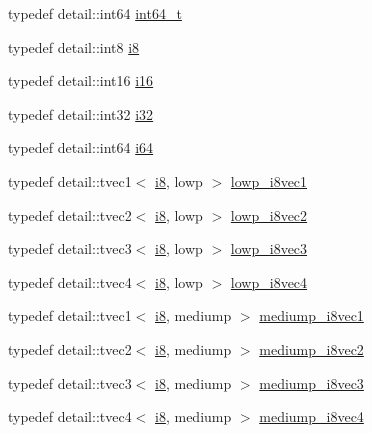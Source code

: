 \begin{CompactItemize}
\item 
typedef detail::int64 \hyperlink{group__gtc__type__precision_g6abb23fbf4e39c50ec5341160b5da5ab}{int64\_\-t}
\item 
typedef detail::int8 \hyperlink{group__gtc__type__precision_gae064be68b7d36cd7910c16e8ad18bba}{i8}
\item 
typedef detail::int16 \hyperlink{group__gtc__type__precision_g35e5542ca05b29cc256fdafb8503d1fd}{i16}
\item 
typedef detail::int32 \hyperlink{group__gtc__type__precision_g1d8ed5c43e91ea7d4528389da4fa9524}{i32}
\item 
typedef detail::int64 \hyperlink{group__gtc__type__precision_gc7a7eaad46064fc952b06df33689da23}{i64}
\item 
typedef detail::tvec1$<$ \hyperlink{group__gtc__type__precision_gae064be68b7d36cd7910c16e8ad18bba}{i8}, lowp $>$ \hyperlink{group__gtc__type__precision_g490ff77964d0386c1db936eb2a324988}{lowp\_\-i8vec1}
\item 
typedef detail::tvec2$<$ \hyperlink{group__gtc__type__precision_gae064be68b7d36cd7910c16e8ad18bba}{i8}, lowp $>$ \hyperlink{group__gtc__type__precision_g511280c8869c7c79bba3c359f37f5559}{lowp\_\-i8vec2}
\item 
typedef detail::tvec3$<$ \hyperlink{group__gtc__type__precision_gae064be68b7d36cd7910c16e8ad18bba}{i8}, lowp $>$ \hyperlink{group__gtc__type__precision_g048811f03c327d4b56564a72d98800e8}{lowp\_\-i8vec3}
\item 
typedef detail::tvec4$<$ \hyperlink{group__gtc__type__precision_gae064be68b7d36cd7910c16e8ad18bba}{i8}, lowp $>$ \hyperlink{group__gtc__type__precision_g095202095a1fefbdae4a974c3b750223}{lowp\_\-i8vec4}
\item 
typedef detail::tvec1$<$ \hyperlink{group__gtc__type__precision_gae064be68b7d36cd7910c16e8ad18bba}{i8}, mediump $>$ \hyperlink{group__gtc__type__precision_g820f8b497e06d518968d00761747c547}{mediump\_\-i8vec1}
\item 
typedef detail::tvec2$<$ \hyperlink{group__gtc__type__precision_gae064be68b7d36cd7910c16e8ad18bba}{i8}, mediump $>$ \hyperlink{group__gtc__type__precision_g38eba1ab306fe5cc5eeafa35ce5b5b26}{mediump\_\-i8vec2}
\item 
typedef detail::tvec3$<$ \hyperlink{group__gtc__type__precision_gae064be68b7d36cd7910c16e8ad18bba}{i8}, mediump $>$ \hyperlink{group__gtc__type__precision_g91b40a693c1db26a7cc544339b326df3}{mediump\_\-i8vec3}
\item 
typedef detail::tvec4$<$ \hyperlink{group__gtc__type__precision_gae064be68b7d36cd7910c16e8ad18bba}{i8}, mediump $>$ \hyperlink{group__gtc__type__precision_gd41bf4bfa504dc1191623ff77151d01f}{mediump\_\-i8vec4}

\end{CompactItemize}
